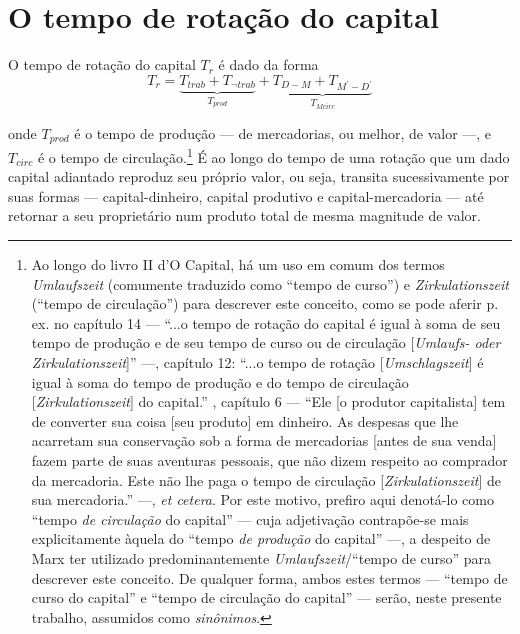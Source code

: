 \section{O tempo de rotação do capital}
O tempo de rotação do capital $T_{r}$ é dado da forma
$$
T_{r} = \underbrace{ T_{trab} + T_{\lnot trab} }_{ T_{prod} } + \underbrace{ T_{D-M} + T_{M^\prime-D^\prime} }_{ T_{Mcirc} }
$$

onde $T_{prod}$ é o tempo de produção — de mercadorias, ou melhor, de valor —, e $T_{circ}$ é o tempo de circulação.\footnote{Ao longo do livro II d'O Capital, há um uso em comum dos termos \textit{Umlaufszeit} (comumente traduzido como ``tempo de curso'') e \textit{Zirkulationszeit} (``tempo de circulação'') para descrever este conceito, como se pode aferir p. ex. no capítulo 14 — ``...o tempo de rotação do capital é igual à soma de seu tempo de produção e de seu tempo de curso ou de circulação [\textit{Umlaufs- oder Zirkulationszeit}]'' \parencite[p. 343]{Marx2014} —, capítulo 12: ``...o tempo de rotação [\textit{Umschlagszeit}] é igual à soma do tempo de produção e do tempo de circulação [\textit{Zirkulationszeit}] do capital.'' \parencite[p. 323]{Marx2014}, capítulo 6 — ``Ele [o produtor capitalista] tem de converter sua coisa [seu produto] em dinheiro. As despesas que lhe acarretam sua conservação sob a forma de mercadorias [antes de sua venda] fazem parte de suas aventuras pessoais, que não dizem respeito ao comprador da mercadoria. Este não lhe paga o tempo de circulação [\textit{Zirkulationszeit}] de sua mercadoria.'' \parencite[p. 225]{Marx2014} —, \textit{et cetera}. Por este motivo, prefiro aqui denotá-lo como ``tempo \textit{de circulação} do capital'' — cuja adjetivação contrapõe-se mais explicitamente àquela do ``tempo \textit{de produção} do capital'' —, a despeito de Marx ter utilizado predominantemente \textit{Umlaufszeit}/``tempo de curso'' para descrever este conceito. De qualquer forma, ambos estes termos — ``tempo de curso do capital'' e ``tempo de circulação do capital'' — serão, neste presente trabalho, assumidos como \textit{sinônimos}. } É ao longo do tempo de uma rotação que um dado capital adiantado reproduz seu próprio valor, ou seja, transita sucessivamente por suas formas — capital-dinheiro, capital produtivo e capital-mercadoria — até retornar a seu proprietário num produto total de mesma magnitude de valor. 

